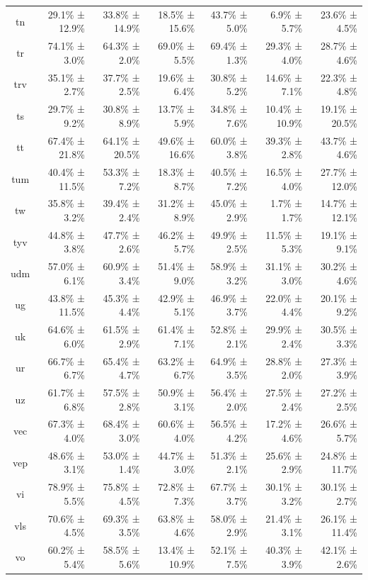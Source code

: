 \documentclass[10pt, a4paper]{article}
\begin{document}
\begin{table}[h]
\begin{tabular}{crrrrrr}
tn & 29.1\% ± 12.9\% & 33.8\% ± 14.9\% & 18.5\% ± 15.6\% & 43.7\% ± 5.0\% & 6.9\% ± 5.7\% & 23.6\% ± 4.5\% \\
tr & 74.1\% ± 3.0\% & 64.3\% ± 2.0\% & 69.0\% ± 5.5\% & 69.4\% ± 1.3\% & 29.3\% ± 4.0\% & 28.7\% ± 4.6\% \\
trv & 35.1\% ± 2.7\% & 37.7\% ± 2.5\% & 19.6\% ± 6.4\% & 30.8\% ± 5.2\% & 14.6\% ± 7.1\% & 22.3\% ± 4.8\% \\
ts & 29.7\% ± 9.2\% & 30.8\% ± 8.9\% & 13.7\% ± 5.9\% & 34.8\% ± 7.6\% & 10.4\% ± 10.9\% & 19.1\% ± 20.5\% \\
tt & 67.4\% ± 21.8\% & 64.1\% ± 20.5\% & 49.6\% ± 16.6\% & 60.0\% ± 3.8\% & 39.3\% ± 2.8\% & 43.7\% ± 4.6\% \\
tum & 40.4\% ± 11.5\% & 53.3\% ± 7.2\% & 18.3\% ± 8.7\% & 40.5\% ± 7.2\% & 16.5\% ± 4.0\% & 27.7\% ± 12.0\% \\
tw & 35.8\% ± 3.2\% & 39.4\% ± 2.4\% & 31.2\% ± 8.9\% & 45.0\% ± 2.9\% & 1.7\% ± 1.7\% & 14.7\% ± 12.1\% \\
tyv & 44.8\% ± 3.8\% & 47.7\% ± 2.6\% & 46.2\% ± 5.7\% & 49.9\% ± 2.5\% & 11.5\% ± 5.3\% & 19.1\% ± 9.1\% \\
udm & 57.0\% ± 6.1\% & 60.9\% ± 3.4\% & 51.4\% ± 9.0\% & 58.9\% ± 3.2\% & 31.1\% ± 3.0\% & 30.2\% ± 4.6\% \\
ug & 43.8\% ± 11.5\% & 45.3\% ± 4.4\% & 42.9\% ± 5.1\% & 46.9\% ± 3.7\% & 22.0\% ± 4.4\% & 20.1\% ± 9.2\% \\
uk & 64.6\% ± 6.0\% & 61.5\% ± 2.9\% & 61.4\% ± 7.1\% & 52.8\% ± 2.1\% & 29.9\% ± 2.4\% & 30.5\% ± 3.3\% \\
ur & 66.7\% ± 6.7\% & 65.4\% ± 4.7\% & 63.2\% ± 6.7\% & 64.9\% ± 3.5\% & 28.8\% ± 2.0\% & 27.3\% ± 3.9\% \\
uz & 61.7\% ± 6.8\% & 57.5\% ± 2.8\% & 50.9\% ± 3.1\% & 56.4\% ± 2.0\% & 27.5\% ± 2.4\% & 27.2\% ± 2.5\% \\
vec & 67.3\% ± 4.0\% & 68.4\% ± 3.0\% & 60.6\% ± 4.0\% & 56.5\% ± 4.2\% & 17.2\% ± 4.6\% & 26.6\% ± 5.7\% \\
vep & 48.6\% ± 3.1\% & 53.0\% ± 1.4\% & 44.7\% ± 3.0\% & 51.3\% ± 2.1\% & 25.6\% ± 2.9\% & 24.8\% ± 11.7\% \\
vi & 78.9\% ± 5.5\% & 75.8\% ± 4.5\% & 72.8\% ± 7.3\% & 67.7\% ± 3.7\% & 30.1\% ± 3.2\% & 30.1\% ± 2.7\% \\
vls & 70.6\% ± 4.5\% & 69.3\% ± 3.5\% & 63.8\% ± 4.6\% & 58.0\% ± 2.9\% & 21.4\% ± 3.1\% & 26.1\% ± 11.4\% \\
vo & 60.2\% ± 5.4\% & 58.5\% ± 5.6\% & 13.4\% ± 10.9\% & 52.1\% ± 7.5\% & 40.3\% ± 3.9\% & 42.1\% ± 2.6\% \\

\end{tabular}
\end{table}
\end{document}
